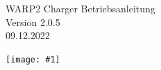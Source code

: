 \documentclass[a4paper,10pt]{article}
\title{}
\author{}
\newcommand{\gfx}[1]{\texttt{[image: \#1]}}
\begin{document}
\pagestyle{empty}
\begin{titlepage}
	\vspace*{-3.08cm}
	\colorbox{boxgray}{}
	\vfill
	\begin{center}
		\Huge
		WARP2 Charger Betriebsanleitung\\\vspace{1cm}
		\large
		Version 2.0.5\\\vspace{0.25cm}
		09.12.2022
	\end{center}
	\vfill \gfx{./img_warp2/resized/warp_perspective_blue_ready}
\end{titlepage}
\newpage
\null
\newpage
\pagestyle{fancy}
\end{document}
